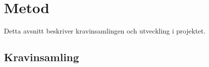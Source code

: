 \documentclass{article}
\begin{document}
 
\section{Metod}


Detta avsnitt beskriver kravinsamlingen och utveckling i projektet.
\subsection{Kravinsamling}

\end{document}
